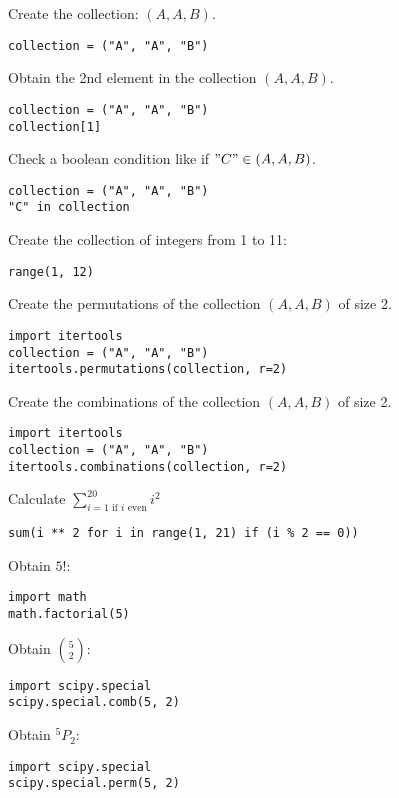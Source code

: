 \documentclass{article}
\begin{document}
\begin{multicols}{2}
    Create the collection: \((A, A, B)\).

        \begin{verbatim}
collection = ("A", "A", "B")
    \end{verbatim}

        Obtain the 2nd element in the collection \((A, A, B)\).

        \begin{verbatim}
collection = ("A", "A", "B")
collection[1]
        \end{verbatim}

        Check a boolean condition like if \("C"\in (A, A, B)\).

        \begin{verbatim}
collection = ("A", "A", "B")
"C" in collection
        \end{verbatim}

        Create the collection of integers from 1 to 11:

        \begin{verbatim}
range(1, 12)
        \end{verbatim}

        Create the permutations of the collection \((A, A, B)\) of size 2.

        \begin{verbatim}
import itertools
collection = ("A", "A", "B")
itertools.permutations(collection, r=2)
        \end{verbatim}

        Create the combinations of the collection \((A, A, B)\) of size 2.

        \begin{verbatim}
import itertools
collection = ("A", "A", "B")
itertools.combinations(collection, r=2)
        \end{verbatim}

        Calculate \(\sum_{i=1\text{ if }i\text{ even}}^{20}i ^ 2\)

        \begin{verbatim}
sum(i ** 2 for i in range(1, 21) if (i % 2 == 0))
        \end{verbatim}

        Obtain \(5!\):

        \begin{verbatim}
import math
math.factorial(5)
        \end{verbatim}

        Obtain \({5 \choose 2}\):

        \begin{verbatim}
import scipy.special
scipy.special.comb(5, 2)
        \end{verbatim}

        Obtain \(^5 P_2\):

        \begin{verbatim}
import scipy.special
scipy.special.perm(5, 2)
        \end{verbatim}


\end{multicols}
\end{document}
